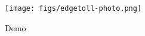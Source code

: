 \documentclass[10pt, conference, letterpaper]{IEEEtran}
\begin{document}
\begin{figure}[ht]
\centering
\texttt{[image: figs/edgetoll-photo.png]}
\caption{Demo}
\label{fig:demo}
\end{figure}








\end{document}

